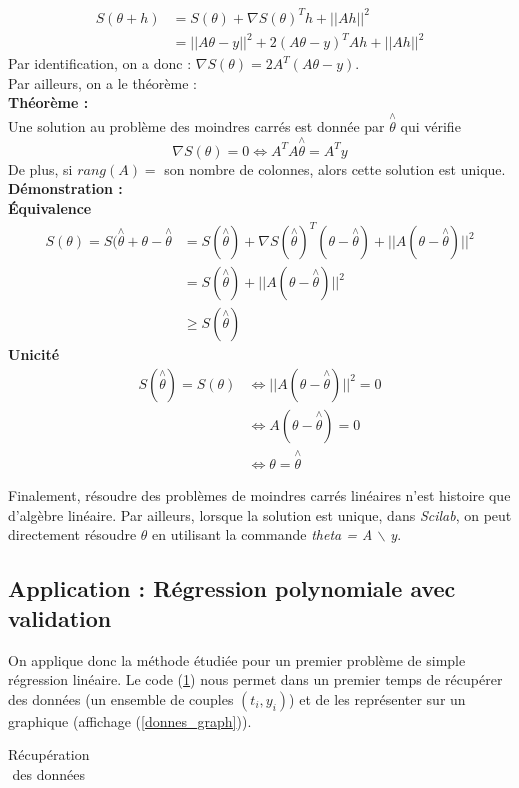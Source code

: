 \documentclass[a4paper,10pt]{report}
\begin{document}
\begin{align*}
S(\theta+h) & = S(\theta) + \nabla S(\theta)^Th + ||Ah||^2 \\
			& = ||A\theta -y||^2 + 2(A\theta-y)^TAh + ||Ah||^2
\end{align*}
Par identification, on a donc : $\nabla S(\theta)=2A^T(A\theta -y)$.\\
Par ailleurs, on a le théorème :\\
\textbf{Théorème :}\\
Une solution au problème des moindres carrés est donnée par $\overset{\wedge}{\theta}$ qui vérifie
\begin{equation}
\nabla S(\theta)=0 \Leftrightarrow A^TA\overset{\wedge}{\theta}=A^Ty
\end{equation}
De plus, si $rang(A)=$ son nombre de colonnes, alors cette solution est unique. \\

\textbf{Démonstration :}\\
\indent \textbf{Équivalence}\\
\indent \begin{align*}
		S(\theta)=S(\overset{\wedge}{\theta}+\theta -\overset{\wedge}{\theta} & = S(\overset{\wedge}{\theta}) + \nabla S(\overset{\wedge}{\theta})^T(\theta - \overset{\wedge}{\theta}) + ||A(\theta - \overset{\wedge}{\theta})||^2 \\
		& = S(\overset{\wedge}{\theta}) + ||A(\theta - \overset{\wedge}{\theta})||^2 \\
		& \geq S(\overset{\wedge}{\theta})
\end{align*}
\indent \textbf{Unicité}\\
\indent \begin{align*}
S(\overset{\wedge}{\theta})=S(\theta) & \Longleftrightarrow ||A(\theta - \overset{\wedge}{\theta})||^2 = 0 \\
& \Longleftrightarrow A(\theta - \overset{\wedge}{\theta})=0 \\
& \Longleftrightarrow \theta = \overset{\wedge}{\theta}
\end{align*}

Finalement, résoudre des problèmes de moindres carrés linéaires n'est histoire que d'algèbre linéaire. Par ailleurs, lorsque la solution est unique, dans \textit{Scilab}, on peut directement résoudre $\theta$ en utilisant la commande \textit{theta = A $\backslash$ y}.

\subsection{Application : Régression polynomiale avec validation}
On applique donc la méthode étudiée pour un premier problème de simple régression linéaire. Le code (\ref{donnes}) nous permet dans un premier temps de récupérer des données (un ensemble de couples $(t_i,y_i)$) et de les représenter sur un graphique (affichage (\ref{donnes_graph})).
\begin{table}[H]
\caption{Récupération des données}
\begin{tabular}{l}

\label{donnes}
\end{tabular}
\end{table}
\end{document}

